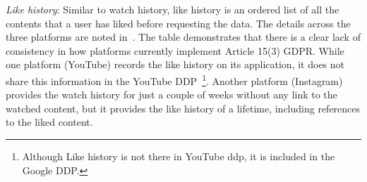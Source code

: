 \begin{table}[t]
\centering
{}
\caption{Comparison of watch history data across platforms.}
\label{tab:watch_history_comparison}
\end{table}


\noindent
\textit{Like history}: Similar to watch history, like history is an ordered list of all the contents that a user has liked before requesting the data. The details across the three platforms are noted in~. The table demonstrates that there is a clear lack of consistency in how platforms currently implement Article 15(3) GDPR.
While one platform (YouTube) records the like history on its application, it does not share this information in the YouTube DDP~\footnote{Although Like history is not there in YouTube ddp, it is included in the Google DDP.}. 
Another platform (Instagram) provides the watch history for just a couple of weeks without any link to the watched content, but it provides the like history of a lifetime, including references to the liked content. 


